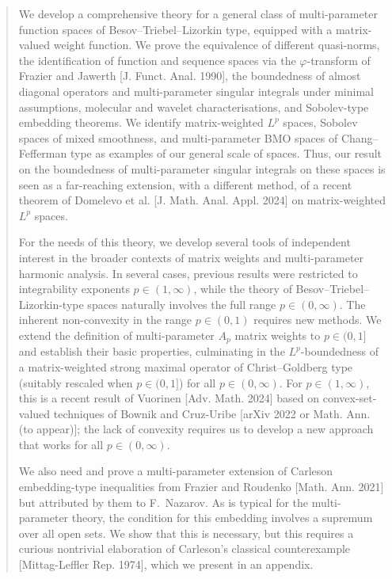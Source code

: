\documentclass[11pt, reqno]{amsart}
\theoremstyle{definition}
\theoremstyle{remark}
\numberwithin{equation}{section}
\begin{document}

\begin{abstract}
We develop a comprehensive theory for a general class of multi-parameter function spaces of Besov--Triebel--Lizorkin type, equipped with a matrix-valued weight function. We prove the equivalence of different quasi-norms, the identification of function and sequence spaces via the $\varphi$-transform of Frazier and Jawerth [J. Funct. Anal. 1990], the boundedness of almost diagonal operators and multi-parameter singular integrals under minimal assumptions, molecular and wavelet characterisations, and Sobolev-type embedding theorems. We identify matrix-weighted $L^p$ spaces, Sobolev spaces of mixed smoothness, and multi-parameter BMO spaces of Chang--Fefferman type as examples of our general scale of spaces. Thus, our result on the boundedness of multi-parameter singular integrals on these spaces is seen as a far-reaching extension, with a different method, of a recent theorem of Domelevo et al. [J. Math. Anal. Appl. 2024] on matrix-weighted $L^p$ spaces.

For the needs of this theory, we develop several tools of independent interest in the broader contexts of matrix weights and multi-parameter harmonic analysis. In several cases, previous results were restricted to integrability exponents $p\in(1,\infty)$, while the theory of Besov--Triebel--Lizorkin-type spaces naturally involves the full range $p\in(0,\infty)$. The inherent non-convexity in the range $p\in(0,1)$ requires new methods. We extend the definition of multi-parameter $A_p$ matrix weights to $p\in(0,1]$ and establish their basic properties, culminating in the $L^p$-boundedness of a matrix-weighted strong maximal operator of Christ--Goldberg type (suitably rescaled when $p\in(0,1]$) for all $p\in(0,\infty)$. For $p\in(1,\infty)$, this is a recent result of Vuorinen [Adv. Math. 2024] based on convex-set-valued techniques of Bownik and Cruz-Uribe [arXiv 2022 or Math. Ann. (to appear)]; the lack of convexity requires us to develop a new approach that works for all $p\in(0,\infty)$.

We also need and prove a multi-parameter extension of Carleson embedding-type inequalities from Frazier and Roudenko [Math. Ann. 2021] but attributed by them to F.~Nazarov. As is typical for the multi-parameter theory, the condition for this embedding involves a supremum over all open sets. We show that this is necessary, but this requires a curious nontrivial elaboration of Carleson's classical counterexample [Mittag-Leffler Rep. 1974], which we present in an appendix.
\end{abstract}
\end{document}
